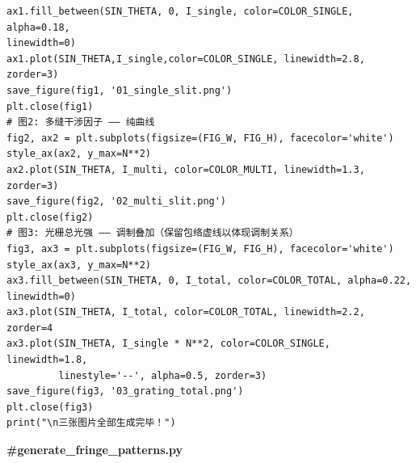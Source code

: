 \documentclass[12pt,a4paper]{ctexrep}
\begin{document}
\begin{lstlisting}[style=pycode]
ax1.fill_between(SIN_THETA, 0, I_single, color=COLOR_SINGLE, alpha=0.18,
linewidth=0)
ax1.plot(SIN_THETA,I_single,color=COLOR_SINGLE, linewidth=2.8, zorder=3)
save_figure(fig1, '01_single_slit.png')
plt.close(fig1)
# 图2: 多缝干涉因子 —— 纯曲线
fig2, ax2 = plt.subplots(figsize=(FIG_W, FIG_H), facecolor='white')
style_ax(ax2, y_max=N**2)
ax2.plot(SIN_THETA, I_multi, color=COLOR_MULTI, linewidth=1.3, zorder=3)
save_figure(fig2, '02_multi_slit.png')
plt.close(fig2)
# 图3: 光栅总光强 —— 调制叠加（保留包络虚线以体现调制关系）
fig3, ax3 = plt.subplots(figsize=(FIG_W, FIG_H), facecolor='white')
style_ax(ax3, y_max=N**2)
ax3.fill_between(SIN_THETA, 0, I_total, color=COLOR_TOTAL, alpha=0.22, linewidth=0)
ax3.plot(SIN_THETA, I_total, color=COLOR_TOTAL, linewidth=2.2, zorder=4
ax3.plot(SIN_THETA, I_single * N**2, color=COLOR_SINGLE, linewidth=1.8,
         linestyle='--', alpha=0.5, zorder=3)
save_figure(fig3, '03_grating_total.png')
plt.close(fig3)
print("\n三张图片全部生成完毕！")
\end{lstlisting}

\textbf{\#generate\_fringe\_patterns.py}
\end{document}
